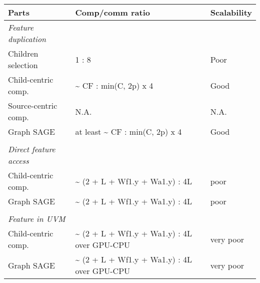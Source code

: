\documentclass[10pt,oneside]{memoir}
\begin{document}
\begin{longtable}[]{@{}lll@{}}
\toprule
Parts & Comp/comm ratio & Scalability\tabularnewline
\midrule
\endhead
\emph{Feature duplication} & &\tabularnewline
Children selection & 1 : 8 & Poor\tabularnewline
Child-centric comp. & \textasciitilde{} CF : min(C, 2p) x 4 &
Good\tabularnewline
Source-centric comp. & N.A. & N.A.\tabularnewline
Graph SAGE & at least \textasciitilde{} CF : min(C, 2p) x 4 &
Good\tabularnewline
& &\tabularnewline
\emph{Direct feature access} & &\tabularnewline
Child-centric comp. & \textasciitilde{} (2 + L + Wf1.y + Wa1.y) : 4L &
poor\tabularnewline
Graph SAGE & \textasciitilde{} (2 + L + Wf1.y + Wa1.y) : 4L &
poor\tabularnewline
& &\tabularnewline
\emph{Feature in UVM} & &\tabularnewline
Child-centric comp. & \textasciitilde{} (2 + L + Wf1.y + Wa1.y) : 4L
over GPU-CPU & very poor\tabularnewline
Graph SAGE & \textasciitilde{} (2 + L + Wf1.y + Wa1.y) : 4L over GPU-CPU
& very poor\tabularnewline
\bottomrule
\end{longtable}
\end{document}
